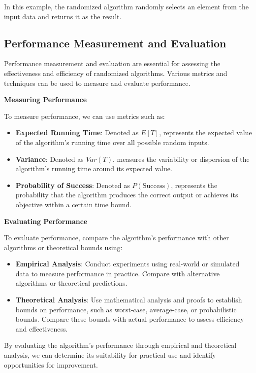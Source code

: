 \documentclass[12pt]{book} %
\begin{document}
In this example, the randomized algorithm randomly selects an element from the input data and returns it as the result.

\subsection{Performance Measurement and Evaluation}

Performance measurement and evaluation are essential for assessing the effectiveness and efficiency of randomized algorithms. Various metrics and techniques can be used to measure and evaluate performance.

\textbf{Measuring Performance}

To measure performance, we can use metrics such as:

\begin{itemize}
    \item \textbf{Expected Running Time}: Denoted as \(E[T]\), represents the expected value of the algorithm's running time over all possible random inputs.
    \item \textbf{Variance}: Denoted as \(Var(T)\), measures the variability or dispersion of the algorithm's running time around its expected value.
    \item \textbf{Probability of Success}: Denoted as \(P(\text{Success})\), represents the probability that the algorithm produces the correct output or achieves its objective within a certain time bound.
\end{itemize}

\textbf{Evaluating Performance}

To evaluate performance, compare the algorithm's performance with other algorithms or theoretical bounds using:

\begin{itemize}
    \item \textbf{Empirical Analysis}: Conduct experiments using real-world or simulated data to measure performance in practice. Compare with alternative algorithms or theoretical predictions.
    \item \textbf{Theoretical Analysis}: Use mathematical analysis and proofs to establish bounds on performance, such as worst-case, average-case, or probabilistic bounds. Compare these bounds with actual performance to assess efficiency and effectiveness.
\end{itemize}

By evaluating the algorithm's performance through empirical and theoretical analysis, we can determine its suitability for practical use and identify opportunities for improvement.
\end{document}
